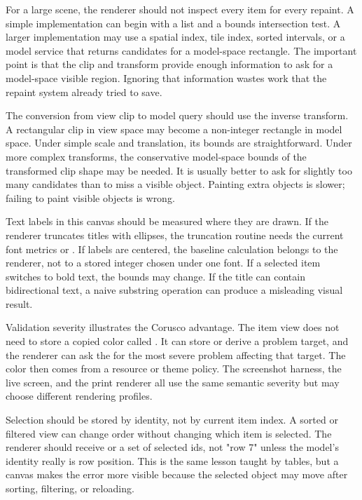 For a large scene, the renderer should not inspect every item for every repaint. A simple implementation can begin with a list and a bounds intersection test. A larger implementation may use a spatial index, tile index, sorted intervals, or a model service that returns candidates for a model-space rectangle. The important point is that the clip and transform provide enough information to ask for a model-space visible region. Ignoring that information wastes work that the repaint system already tried to save.

The conversion from view clip to model query should use the inverse transform. A rectangular clip in view space may become a non-integer rectangle in model space. Under simple scale and translation, its bounds are straightforward. Under more complex transforms, the conservative model-space bounds of the transformed clip shape may be needed. It is usually better to ask for slightly too many candidates than to miss a visible object. Painting extra objects is slower; failing to paint visible objects is wrong.

Text labels in this canvas should be measured where they are drawn. If the renderer truncates titles with ellipses, the truncation routine needs the current font metrics or . If labels are centered, the baseline calculation belongs to the renderer, not to a stored integer chosen under one font. If a selected item switches to bold text, the bounds may change. If the title can contain bidirectional text, a naive substring operation can produce a misleading visual result.

Validation severity illustrates the Corusco advantage. The item view does not need to store a copied color called . It can store or derive a problem target, and the renderer can ask the  for the most severe problem affecting that target. The color then comes from a resource or theme policy. The screenshot harness, the live screen, and the print renderer all use the same semantic severity but may choose different rendering profiles.

Selection should be stored by identity, not by current item index. A sorted or filtered view can change order without changing which item is selected. The renderer should receive  or a set of selected ids, not "row 7" unless the model's identity really is row position. This is the same lesson taught by tables, but a canvas makes the error more visible because the selected object may move after sorting, filtering, or reloading.


